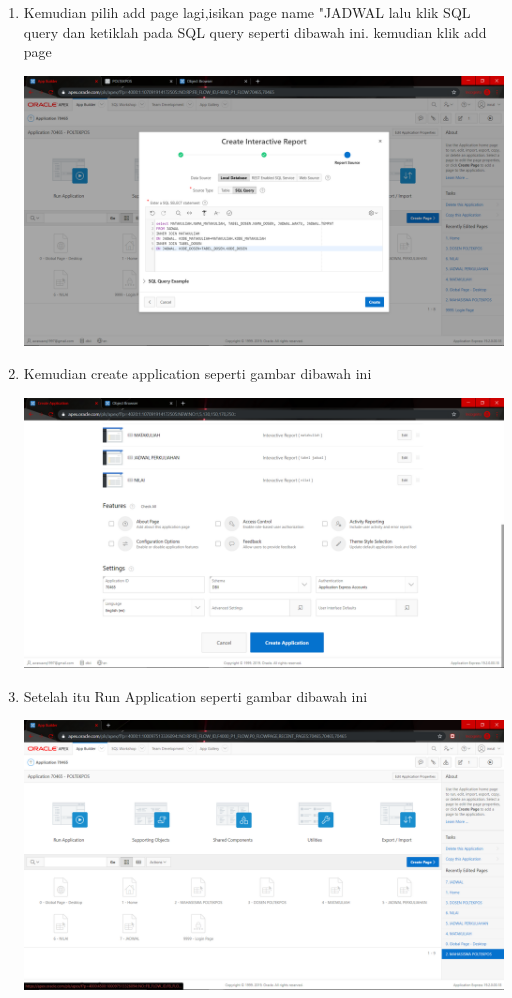 \begin{enumerate}
     \item Kemudian pilih add page lagi,isikan page name "JADWAL lalu klik SQL query dan ketiklah pada SQL query seperti dibawah ini. kemudian klik add page
	\begin{center}
    \includegraphics[scale=0.2]{Apex/69.png}
    \end{center}
    
     \item Kemudian create application seperti gambar dibawah ini
	\begin{center}
    \includegraphics[scale=0.2]{Apex/73.png}
    \end{center}
    
     \item Setelah itu Run Application seperti gambar dibawah ini
	\begin{center}
    \includegraphics[scale=0.2]{Apex/74.png}
    \end{center}
    

\end{enumerate}
